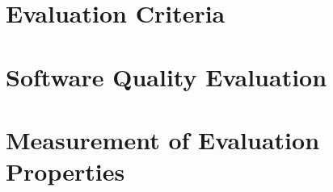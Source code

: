 \documentclass[DIV=calc,paper=a4,fontsize=9pt,twocolumn]{scrartcl}
\begin{document}
\section{Evaluation Criteria}

\section{Software Quality Evaluation}

\section{Measurement of Evaluation Properties}




\end{document}
